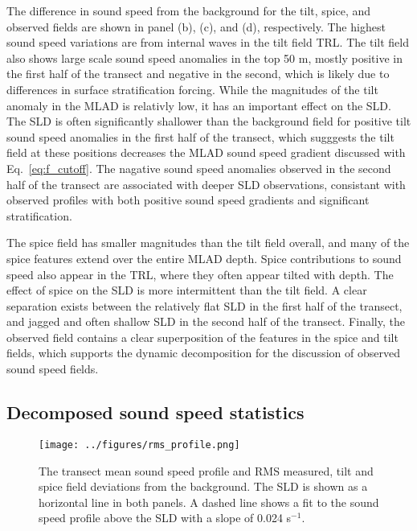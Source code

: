 \documentclass[preprint,NumberedRefs]{JASA}
\begin{document}
The difference in sound speed from the background for the tilt, spice, and observed fields are shown in panel (b), (c), and (d), respectively. The highest sound speed variations are from internal waves in the tilt field TRL. The tilt field also shows large scale sound speed anomalies in the top 50 m, mostly positive in the first half of the transect and negative in the second, which is likely due to differences in surface stratification forcing\cite{colosi2020observations}. While the magnitudes of the tilt anomaly in the MLAD is relativly low, it has an important effect on the SLD. The SLD is often significantly shallower than the background field for positive tilt sound speed anomalies in the first half of the transect, which sugggests the tilt field at these positions decreases the MLAD sound speed gradient discussed with Eq.~\eqref{eq:f_cutoff}. The nagative sound speed anomalies observed in the second half of the transect are associated with deeper SLD observations, consistant with observed profiles with both positive sound speed gradients and significant stratification\cite{colosi2020observations}.

The spice field has smaller magnitudes than the tilt field overall, and many of the spice features extend over the entire MLAD depth. Spice contributions to sound speed also appear in the TRL, where they often appear tilted with depth. The effect of spice on the SLD is more intermittent than the tilt field. A clear separation exists between the relatively flat SLD in the first half of the transect, and jagged and often shallow SLD in the second half of the transect. Finally, the observed field contains a clear superposition of the features in the spice and tilt fields, which supports the dynamic decomposition for the discussion of observed sound speed fields.

\subsection{Decomposed sound speed statistics}
\begin{figure}
\texttt{[image: ../figures/rms\_profile.png]}
        \caption{\label{fig:c_rms}{The transect mean sound speed profile and RMS measured, tilt and spice field deviations from the background. The SLD is shown as a horizontal line in both panels. A dashed line shows a fit to the sound speed profile above the SLD with a slope of 0.024 s$^{-1}$.}}
\end{figure}
\end{document}
